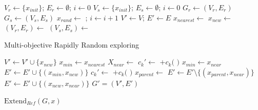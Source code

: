 \documentclass[conference]{IEEEtran}
\begin{document}
\begin{algorithm}
\begin{algorithmic}[1]
	\State $ V_{r} \leftarrow \{ x_{init} \} $; $ E_{r} \leftarrow \emptyset $; $ i \leftarrow 0 $
\EndFor
{} 
	\State $ V_{s} \leftarrow \{ x_{init} \} $; $ E_{s} \leftarrow \emptyset $; $ i \leftarrow 0 $
\EndFor
{}
		\State $ G_{r} \leftarrow (V_{r}, E_{r}) $
	\EndFor
		\State $ G_{s} \leftarrow (V_{s}, E_{s}) $
	\EndFor
	\State $ x_{rand} \leftarrow $  ; $ i \leftarrow i + 1 $
	\State $ V' \leftarrow V $; $ E' \leftarrow E $
	\State $ x_{nearest} \leftarrow $ 
	\State $ x_{new} \leftarrow $ 
		\State $ (V_{r}, E_{r}) \leftarrow $ 
		\EndFor
		\State $ (V_{s}, E_{s}) \leftarrow $ 
		\EndFor
	\EndIf
\EndWhile
\end{algorithmic}
\label{alg:rapidly_exploring_process}
\caption{Multi-objective Rapidly Random exploring }
\end{algorithm}

\begin{algorithm}
\begin{algorithmic}[1]
\State $ V' \leftarrow V' \cup \{ x_{new} \} $
\State $ x_{min} \leftarrow x_{nearest} $
\State $ X_{near} \leftarrow $ 
		\State $ c_{k}' \leftarrow $  $ + c_{k}( $  $ ) $ 
		\State $ x_{min} \leftarrow x_{near} $
		\EndIf
	\EndIf
\EndFor
\State $ E' \leftarrow E' \cup \{ ( x_{min}, x_{new} ) \} $
	    \State $ c_{k}' \leftarrow $  $ + c_{k}( $  $ ) $ 
			\State $ x_{parent} \leftarrow $ 
			\State $ E' \leftarrow E' \setminus \{ ( x_{parent}, x_{near} ) \} $
			\State $ E' \leftarrow E' \cup \{ ( x_{new}, x_{near} ) \} $
		\EndIf
	\EndIf
\EndFor
\Return $ G' = (V', E') $ 
\end{algorithmic}
\label{alg:morrtstar:extend:ref}
\caption{ $ \mbox{Extend}_{Ref} (G, x) $}
\end{algorithm} 
\end{document}
